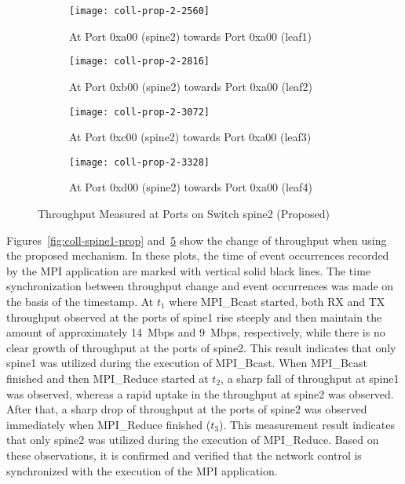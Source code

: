 \begin{figure}
    \begin{subfigure}{.45\linewidth}
        \texttt{[image: coll-prop-2-2560]}
        \caption{At Port 0xa00 (spine2) \newline towards Port 0xa00 (leaf1)}%
        \label{fig:spine2-leaf1-prop}
    \end{subfigure}
    \begin{subfigure}{.45\linewidth}
        \texttt{[image: coll-prop-2-2816]}
        \caption{At Port 0xb00 (spine2) \newline towards Port 0xa00 (leaf2)}%
        \label{fig:spine2-leaf2-prop}
    \end{subfigure}
    \begin{subfigure}{.45\linewidth}
        \texttt{[image: coll-prop-2-3072]}
        \caption{At Port 0xc00 (spine2) \newline towards Port 0xa00 (leaf3)}%
        \label{fig:spine2-leaf3-prop}
    \end{subfigure}
    \begin{subfigure}{.45\linewidth}
        \texttt{[image: coll-prop-2-3328]}
        \caption{At Port 0xd00 (spine2) \newline towards Port 0xa00 (leaf4)}%
        \label{fig:spine2-leaf4-prop}
    \end{subfigure}
    \caption{Throughput Measured at Ports on Switch spine2 (Proposed)}%
    \label{fig:coll-spine2-prop}
\end{figure}


Figures~\ref{fig:coll-spine1-prop} and~\ref{fig:coll-spine2-prop} show
the change of throughput when using the proposed mechanism. In these
plots, the time of event occurrences recorded by the MPI application are
marked with vertical solid black lines. The time synchronization between
throughput change and event occurrences was made on the basis of the
timestamp. At \(t_1\) where MPI\_Bcast started, both RX and TX
throughput observed at the ports of spine1 rise steeply and then
maintain the amount of approximately 14~Mbps and 9~Mbps, respectively,
while there is no clear growth of throughput at the ports of spine2.
This result indicates that only spine1 was utilized during the execution of
MPI\_Bcast. When MPI\_Bcast finished and then MPI\_Reduce started at
\(t_2\), a sharp fall of throughput at spine1 was observed, whereas a
rapid uptake in the throughput at spine2 was observed. After that, a
sharp drop of throughput at the ports of spine2 was observed immediately
when MPI\_Reduce finished (\(t_3\)). This measurement result indicates
that only spine2 was utilized during the execution of MPI\_Reduce. Based
on these observations, it is confirmed and verified that the network
control is synchronized with the execution of the MPI application.

